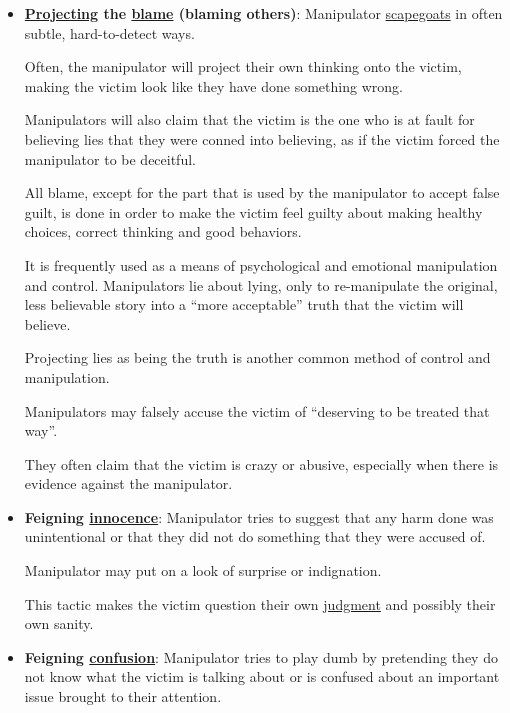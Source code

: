 \documentclass{book}
\numberwithin{equation}{section}
\begin{document}
\begin{itemize}
    They will also offer help with the intent to gain trust and access to an unsuspecting victim they have charmed.
    \item \textbf{\href{https://en.wikipedia.org/wiki/Psychological_projection}{Projecting} the \href{https://en.wikipedia.org/wiki/Blame}{blame} (blaming others)}: Manipulator \href{https://en.wikipedia.org/wiki/Scapegoats}{scapegoats} in often subtle, hard-to-detect ways.
    
    Often, the manipulator will project their own thinking onto the victim, making the victim look like they have done something wrong.
    
    Manipulators will also claim that the victim is the one who is at fault for believing lies that they were conned into believing, as if the victim forced the manipulator to be deceitful.
    
    All blame, except for the part that is used by the manipulator to accept false guilt, is done in order to make the victim feel guilty about making healthy choices, correct thinking and good behaviors.
    
    It is frequently used as a means of psychological and emotional manipulation and control. Manipulators lie about lying, only to re-manipulate the original, less believable story into a ``more acceptable'' truth that the victim will believe.
    
    Projecting lies as being the truth is another common method of control and manipulation.
    
    Manipulators may falsely accuse the victim of ``deserving to be treated that way''.
    
    They often claim that the victim is crazy or abusive, especially when there is evidence against the manipulator.
    \item \textbf{Feigning \href{https://en.wikipedia.org/wiki/Innocence}{innocence}}: Manipulator tries to suggest that any harm done was unintentional or that they did not do something that they were accused of.
    
    Manipulator may put on a look of surprise or indignation.
    
    This tactic makes the victim question their own \href{https://en.wikipedia.org/wiki/Judgment}{judgment} and possibly their own sanity.
    \item \textbf{Feigning \href{https://en.wikipedia.org/wiki/Confusion}{confusion}}: Manipulator tries to play dumb by pretending they do not know what the victim is talking about or is confused about an important issue brought to their attention.
    

\end{itemize}
\end{document}

